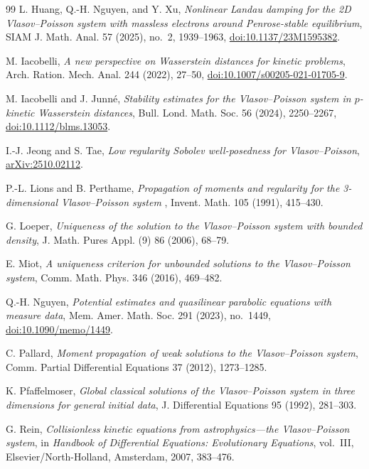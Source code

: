 \documentclass[11pt]{article}
\begin{document}
\begin{thebibliography}{99}
L. Huang, Q.-H. Nguyen, and Y. Xu,
\emph{Nonlinear Landau damping for the 2D Vlasov--Poisson system with
massless electrons around Penrose-stable equilibrium},
SIAM J. Math. Anal. 57 (2025), no.~2, 1939--1963,
\href{https://doi.org/10.1137/23M1595382}{doi:10.1137/23M1595382}.

M. Iacobelli,
\emph{A new perspective on Wasserstein distances for kinetic problems},
Arch. Ration. Mech. Anal. 244 (2022), 27--50,
\href{https://doi.org/10.1007/s00205-021-01705-9}
{doi:10.1007/s00205-021-01705-9}.

M. Iacobelli and J. Junn\'e,
\emph{Stability estimates for the Vlasov--Poisson system in $p$-kinetic
Wasserstein distances},
Bull. Lond. Math. Soc. 56 (2024), 2250--2267,
\href{https://doi.org/10.1112/blms.13053}{doi:10.1112/blms.13053}.

I.-J. Jeong and S. Tae,
\emph{Low regularity Sobolev well-posedness for Vlasov--Poisson},
\href{https://arxiv.org/abs/2510.02112}{arXiv:2510.02112}.

P.-L. Lions and B. Perthame,
 \emph{ Propagation of moments and regularity for the 3-dimensional
 Vlasov--Poisson  system },
 Invent. Math.  105 (1991), 415--430.
 

G. Loeper,
\emph{Uniqueness of the solution to the Vlasov--Poisson system with bounded
density},
J. Math. Pures Appl. (9) 86 (2006), 68--79.

E. Miot,
\emph{A uniqueness criterion for unbounded solutions to the
Vlasov--Poisson system},
Comm. Math. Phys. 346 (2016), 469--482.


Q.-H. Nguyen,
\emph{Potential estimates and quasilinear parabolic equations with measure
data},
Mem. Amer. Math. Soc. 291 (2023), no.~1449,
\href{https://doi.org/10.1090/memo/1449}{doi:10.1090/memo/1449}.


C. Pallard,
\emph{Moment propagation of weak solutions to the Vlasov--Poisson system},
Comm. Partial Differential Equations 37 (2012), 1273--1285.

K. Pfaffelmoser,
\emph{Global classical solutions of the Vlasov--Poisson system in three
dimensions for general initial data},
J. Differential Equations 95 (1992), 281--303.

G. Rein,
\emph{Collisionless kinetic equations from astrophysics---the
Vlasov--Poisson system},
in \emph{Handbook of Differential Equations: Evolutionary Equations},
vol.~III, Elsevier/North-Holland, Amsterdam, 2007, 383--476.


\end{thebibliography}
\end{document}
